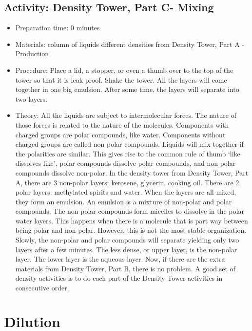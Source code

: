 \begin{itemize}
{\begin{itemize}
\subsection{Activity: Density Tower, Part C- Mixing}
\begin{itemize}
\item{Preparation time: 0 minutes}
\item{Materials: column of liquids different densities from Density Tower, Part A - Production}
\item{Procedure: Place a lid, a stopper, or even a thumb over to the top of the tower so that it is leak proof. Shake the tower. All the layers will come together in one big emulsion. After some time, the layers will separate into two layers.}
\item{Theory: All the liquids are subject to intermolecular forces. The nature of those forces is related to the nature of the molecules. Components with charged groups are polar compounds, like water. Components without charged groups are called non-polar compounds. Liquids will mix together if the polarities are similar. This gives rise to the common rule of thumb ‘like dissolves like’, polar compounds dissolve polar compounds, and non-polar compounds dissolve non-polar. In the density tower from Density Tower, Part A, there are 3 non-polar layers: kerosene, glycerin, cooking oil. There are 2 polar layers: methylated spirits and water. When the layers are all mixed, they form an emulsion. An emulsion is a mixture of non-polar and polar compounds. The non-polar compounds form micelles to dissolve in the polar water layers. This happens when there is a molecule that is part way between being polar and non-polar. However, this is not the most stable organization. Slowly, the non-polar and polar compounds will separate yielding only two layers after a few minutes. The less dense, or upper layer, is the non-polar layer. The lower layer is the aqueous layer. Now, if there are the extra materials from Density Tower, Part B, there is no problem. A good set of density activities is to do each part of the Density Tower activities in consecutive order.}
\end{itemize}

\section{Dilution}


\end{itemize}}
\end{itemize}
